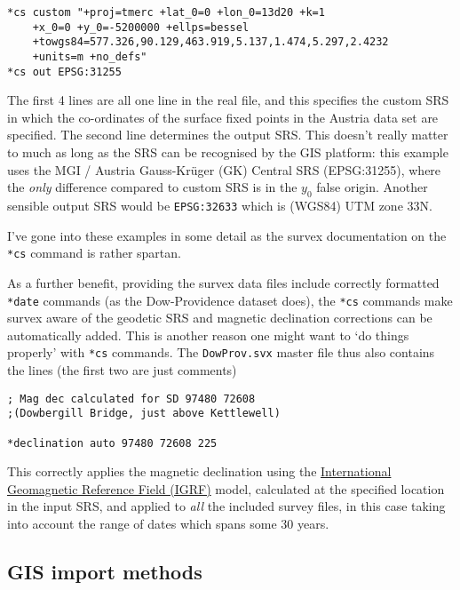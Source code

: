 \documentclass[]{article}
\begin{document}
\begin{verbatim}
*cs custom "+proj=tmerc +lat_0=0 +lon_0=13d20 +k=1 
    +x_0=0 +y_0=-5200000 +ellps=bessel 
    +towgs84=577.326,90.129,463.919,5.137,1.474,5.297,2.4232 
    +units=m +no_defs"
*cs out EPSG:31255
\end{verbatim}

The first 4 lines are all one line in the real file, and this 
specifies the custom SRS in which the co-ordinates of the
surface fixed points in the Austria data set are specified. The second
line determines the output SRS. This doesn't really matter to much as
long as the SRS can be recognised by the GIS platform: this example uses
the MGI / Austria Gauss-Kr\"uger (GK) Central SRS (EPSG:31255), where the
\emph{only} difference compared to custom SRS is in the $y_0$ false
origin. Another sensible output SRS would be \verb}EPSG:32633} which
is (WGS84) UTM zone 33N.

I've gone into these examples in some detail as the survex documentation
on the \verb}*cs} command is rather spartan.

As a further benefit, providing the survex data files include correctly
formatted \verb}*date} commands (as the Dow-Providence dataset does),
the \verb}*cs} commands make survex aware of the geodetic SRS and
magnetic declination corrections can be automatically added. This is
another reason one might want to `do things properly' with \verb}*cs}
commands. The \verb}DowProv.svx} master file thus also contains the
lines (the first two are just comments)

\begin{verbatim}
; Mag dec calculated for SD 97480 72608
;(Dowbergill Bridge, just above Kettlewell)

*declination auto 97480 72608 225
\end{verbatim}

This correctly applies the magnetic declination using the
\href{https://en.wikipedia.org/wiki/International_Geomagnetic_Reference_Field}{International
Geomagnetic Reference Field (IGRF)} model, calculated at the specified
location in the input SRS, and applied to \emph{all} the included survey
files, in this case taking into account the range of dates which spans
some 30 years.

\subsection{GIS import methods}\label{gis-import-methods}
\end{document}
